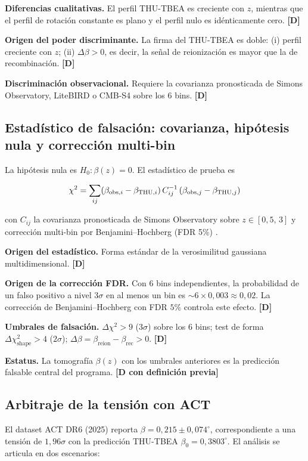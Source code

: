﻿\documentclass[11pt,letterpaper]{article}
\begin{document}
\textbf{Diferencias cualitativas.} El perfil THU-TBEA es creciente con $z$, mientras que el perfil de rotación constante es plano y el perfil nulo es idénticamente cero. \textbf{[D]}

\textbf{Origen del poder discriminante.} La firma del THU-TBEA es doble: (i) perfil creciente con $z$; (ii) $\Delta\beta > 0$, es decir, la señal de reionización es mayor que la de recombinación. \textbf{[D]}

\textbf{Discriminación observacional.} Requiere la covarianza pronosticada de Simons Observatory, LiteBIRD o CMB-S4 sobre los 6 bins. \textbf{[D]}
\subsection{Estadístico de falsación: covarianza, hipótesis nula y corrección multi-bin}
La hipótesis nula es $H_0: \beta(z) = 0$. El estadístico de prueba es

\begin{equation*}
  \resizebox{\ifdim\width>\linewidth \linewidth\else\width\fi}{!}{$\displaystyle \chi^2 = \sum_{ij} (\beta_{\text{obs},i} - \beta_{\text{THU},i})\,C_{ij}^{-1}\,(\beta_{\text{obs},j} - \beta_{\text{THU},j})$}
\end{equation*}

con $C_{ij}$ la covarianza pronosticada de Simons Observatory sobre $z \in [0{,}5,\,3]$ y corrección multi-bin por Benjamini--Hochberg (FDR 5\%) \cite{BenjaminiHochberg1995}.

\textbf{Origen del estadístico.} Forma estándar de la verosimilitud gaussiana multidimensional. \textbf{[D]}

\textbf{Origen de la corrección FDR.} Con $6$ bins independientes, la probabilidad de un falso positivo a nivel $3\sigma$ en al menos un bin es $\sim 6 \times 0{,}003 \approx 0{,}02$. La corrección de Benjamini--Hochberg con FDR $5\%$ controla este efecto. \textbf{[D]}

\textbf{Umbrales de falsación.} $\Delta\chi^2 > 9$ ($3\sigma$) sobre los $6$ bins; test de forma $\Delta\chi^2_{\text{shape}} > 4$ ($2\sigma$); $\Delta\beta = \beta_{\text{reion}} - \beta_{\text{rec}} > 0$. \textbf{[D]}

\textbf{Estatus.} La tomografía $\beta(z)$ con los umbrales anteriores es la predicción falsable central del programa. \textbf{[D con definición previa]}
\subsection{Arbitraje de la tensión con ACT}
El dataset ACT DR6 (2025) reporta $\beta = 0{,}215 \pm 0{,}074^\circ$, correspondiente a una tensión de $1{,}96\sigma$ con la predicción THU-TBEA $\beta_0 = 0{,}3803^\circ$. El análisis se articula en dos escenarios:
\end{document}
